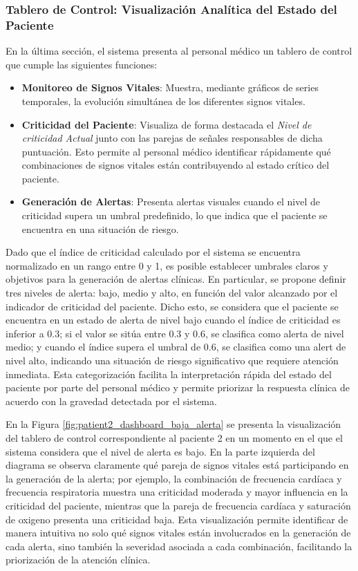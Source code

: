 \bigskip

\subsubsection*{Tablero de Control: Visualización Analítica del Estado del Paciente}

En la última sección, el sistema presenta al personal médico un tablero de control que cumple las siguientes funciones:

\begin{itemize}
  \item \textbf{Monitoreo de Signos Vitales}: Muestra, mediante gráficos de series temporales, la evolución simultánea de los diferentes signos vitales.
  \item \textbf{Criticidad del Paciente}: Visualiza de forma destacada el \emph{Nivel de criticidad Actual} junto con las parejas de señales responsables de dicha puntuación. Esto permite al personal médico identificar rápidamente qué combinaciones de signos vitales están contribuyendo al estado crítico del paciente.
  \item \textbf{Generación de Alertas}: Presenta alertas visuales cuando el nivel de criticidad supera un umbral predefinido, lo que indica que el paciente se encuentra en una situación de riesgo.
\end{itemize}

Dado que el índice de criticidad calculado por el sistema se encuentra normalizado en un rango entre 0 y 1, es posible establecer umbrales claros y objetivos para la generación de alertas clínicas. En particular, se propone definir tres niveles de alerta: bajo, medio y alto, en función del valor alcanzado por el indicador de criticidad del paciente. Dicho esto, se considera que el paciente se encuentra en un estado de alerta de nivel bajo cuando el índice de criticidad es inferior a 0.3; si el valor se sitúa entre 0.3 y 0.6, se clasifica como alerta de nivel medio; y cuando el índice supera el umbral de 0.6, se clasifica como una alert de nivel alto, indicando una situación de riesgo significativo que requiere atención inmediata. Esta categorización facilita la interpretación rápida del estado del paciente por parte del personal médico y permite priorizar la respuesta clínica de acuerdo con la gravedad detectada por el sistema.

En la Figura \ref{fig:patient2_dashboard_baja_alerta} se presenta la visualización del tablero de control correspondiente al paciente 2 en un momento en el que el sistema considera que el nivel de alerta es bajo. En la parte izquierda del diagrama se observa claramente qué pareja de signos vitales está participando en la generación de la alerta; por ejemplo, la combinación de frecuencia cardíaca y frecuencia respiratoria muestra una criticidad moderada y mayor influencia en la criticidad del paciente, mientras que la pareja de frecuencia cardíaca y saturación de oxigeno presenta una criticidad baja. Esta visualización permite identificar de manera intuitiva no solo qué signos vitales están involucrados en la generación de cada alerta, sino también la severidad asociada a cada combinación, facilitando la priorización de la atención clínica.

